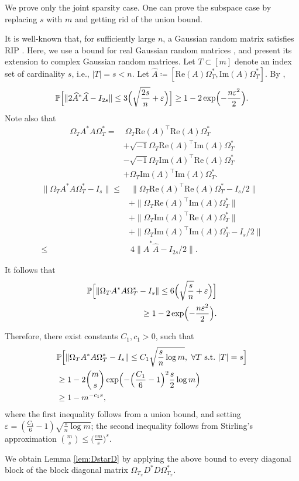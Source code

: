 \documentclass[11pt,journal]{IEEEtran}
\newcommand{\bbP}{\mathbb{P}}
\newcommand{\norm}[1]{\|{#1}\|}
\newcommand{\T}{\top}
\newcommand{\re}{\mathrm{Re}}
\newcommand{\im}{\mathrm{Im}}
\begin{document}
\begin{IEEEproof}
We prove only the joint sparsity case. One can prove the subspace case by replacing $s$ with $m$ and getting rid of the union bound.

It is well-known that, for sufficiently large $n$, a Gaussian random matrix satisfies RIP \cite{Candes2005}. Here, we use a bound for real Gaussian random matrices \cite{Davidson2001}, and present its extension to complex Gaussian random matrices. Let $T\subset [m]$ denote an index set of cardinality $s$, i.e., $|T| = s < n$. Let $\widehat{A} \coloneqq [\re(A)\Omega_{T}^*, \im(A)\Omega_{T}^*]$.
By \cite[Theorem 2.13]{Davidson2001},
\[
\bbP\Bigl[ \norm{2\widehat{A}^*\widehat{A} - I_{2s}} \leq 3\Bigl(\sqrt{\frac{2s}{n}} + \varepsilon \Bigr) \Bigr] 
\geq 1 - 2 \exp\Bigl( - \frac{n \varepsilon^2}{2} \Bigr).
\]
Note also that
\begin{align*}
\Omega_{T} A^*A \Omega_{T}^* = &~ \Omega_{T}\re(A)^\T \re(A) \Omega_{T}^* \\
& + \sqrt{-1} \Omega_{T}\re(A)^\T \im(A) \Omega_{T}^* \\
& - \sqrt{-1}\Omega_{T}\im(A)^\T \re(A) \Omega_{T}^* \\
& + \Omega_{T}\im(A)^\T \im(A) \Omega_{T}^*.
\end{align*}
\begin{align*}
\norm{\Omega_{T} A^*A \Omega_{T}^* - I_s} \leq &~ \norm{\Omega_{T}\re(A)^\T \re(A) \Omega_{T}^* - I_s/2} \\
& + \norm{\Omega_{T}\re(A)^\T \im(A) \Omega_{T}^*} \\
& + \norm{\Omega_{T}\im(A)^\T \re(A) \Omega_{T}^*} \\
& + \norm{\Omega_{T}\im(A)^\T \im(A) \Omega_{T}^* - I_s/2} \\
\leq &~ 4\norm{\widehat{A}^* \widehat{A} - I_{2s}/2 }.
\end{align*}

It follows that
\begin{align*}
\bbP\Bigl[ \norm{\Omega_{T} A^*A \Omega_{T}^* - I_s} \leq 6\Bigl(\sqrt{\frac{s}{n}} + \varepsilon \Bigr) \Bigr] \\ 
\geq 1 - 2 \exp\Bigl( - \frac{n \varepsilon^2}{2} \Bigr).
\end{align*}

Therefore, there exist constants $C_1, c_1 >0$, such that
\begin{align*}
 & \bbP\Bigl[ \norm{\Omega_{T} A^*A \Omega_{T}^* - I_s} \leq C_1 \sqrt{\frac{s}{n}\log m},~\forall T~\text{s.t.}~|T| = s \Bigr] \\
& \geq 1 - 2 {m \choose s} \exp\Bigl( - \Bigl( \frac{C_1}{6}-1 \Bigr)^2 \frac{s}{2}\log m\Bigr) \\
& \geq 1 - m^{-c_1 s},
\end{align*}
where the first inequality follows from a union bound, and setting $\varepsilon = (\frac{C_1}{6}-1)\sqrt{\frac{s}{n}\log m}$; the second inequality follows from Stirling's approximation ${m \choose s}\leq \bigl(\frac{em}{s}\bigr)^s$. 

We obtain Lemma \ref{lem:DstarD} by applying the above bound to every diagonal block of the block diagonal matrix $\Omega_{T_x} D^*D \Omega_{T_x}^*$.
\end{IEEEproof} 
\end{document}
